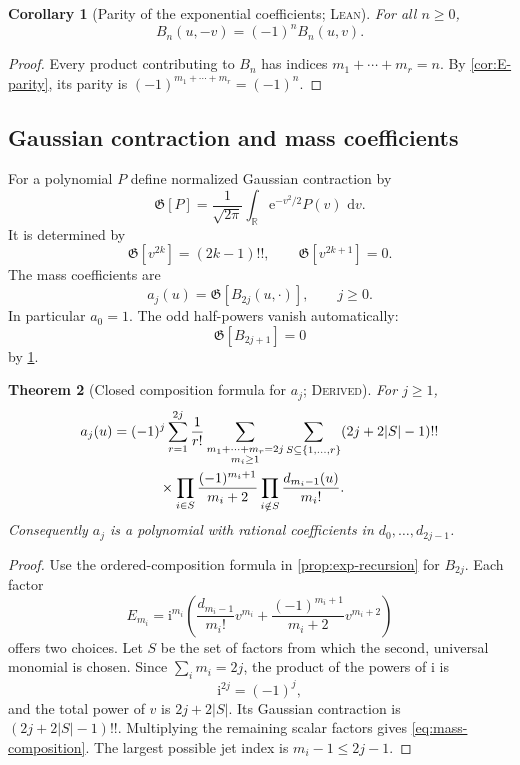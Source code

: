 \documentclass[11pt,oneside]{article}
\newtheorem{theorem}{Theorem}[section]
\newtheorem{corollary}[theorem]{Corollary}
\theoremstyle{definition}
\theoremstyle{remark}
\newcommand{\R}{\mathbb R}
\newcommand{\e}{\mathrm e}
\newcommand{\ii}{\mathrm i}
\newcommand{\dd}{\,\mathrm d}
\newcommand{\Gauss}{\mathfrak G}
\newcommand{\Formalized}{\textsc{Lean}}
\newcommand{\Derived}{\textsc{Derived}}
\begin{document}
\begin{corollary}[Parity of the exponential coefficients; \Formalized]
\label{cor:B-parity}
For all $n\geq0$,
\[
 B_n(u,-v)=(-1)^nB_n(u,v).
\]
\end{corollary}

\begin{proof}
Every product contributing to $B_n$ has indices
$m_1+\cdots+m_r=n$.  By \cref{cor:E-parity}, its parity is
$(-1)^{m_1+\cdots+m_r}=(-1)^n$.
\end{proof}

\subsection{Gaussian contraction and mass coefficients}

For a polynomial $P$ define normalized Gaussian contraction by
\[
 \Gauss[P]
 =\frac1{\sqrt{2\pi}}\int_{\R}\e^{-v^2/2}P(v)\,\dd v.
\]
It is determined by
\begin{equation}
 \Gauss[v^{2k}]=(2k-1)!!,\qquad
 \Gauss[v^{2k+1}]=0. \label{eq:gaussian-moments}
\end{equation}
The mass coefficients are
\begin{equation}
 a_j(u)=\Gauss[B_{2j}(u,\cdot)],\qquad j\geq0.
 \label{eq:mass-coeff-definition}
\end{equation}
In particular $a_0=1$.  The odd half-powers vanish automatically:
\[
 \Gauss[B_{2j+1}]=0
\]
by \cref{cor:B-parity}.

\begin{theorem}[Closed composition formula for \(a_j\); \Derived]
\label{thm:mass-composition}
For $j\geq1$,
\begin{align}
 a_j(u)
 ={}&(-1)^j
 \sum_{r=1}^{2j}\frac1{r!}
 \sum_{\substack{m_1+\cdots+m_r=2j\\m_i\geq1}}
 \sum_{S\subseteq\{1,\dots,r\}}
 (2j+2|S|-1)!! \notag\\
 &\qquad{}\times
 \prod_{i\in S}\frac{(-1)^{m_i+1}}{m_i+2}
 \prod_{i\notin S}\frac{d_{m_i-1}(u)}{m_i!}.
 \label{eq:mass-composition}
\end{align}
Consequently $a_j$ is a polynomial with rational coefficients in
$d_0,\dots,d_{2j-1}$.
\end{theorem}

\begin{proof}
Use the ordered-composition formula in
\cref{prop:exp-recursion} for $B_{2j}$.  Each factor
\[
 E_{m_i}
 =\ii^{m_i}\left(
   \frac{d_{m_i-1}}{m_i!}v^{m_i}
   +\frac{(-1)^{m_i+1}}{m_i+2}v^{m_i+2}
 \right)
\]
offers two choices.  Let $S$ be the set of factors from which the second,
universal monomial is chosen.  Since $\sum_i m_i=2j$, the product of the
powers of $\ii$ is
\[
 \ii^{2j}=(-1)^j,
\]
and the total power of $v$ is $2j+2|S|$.  Its Gaussian contraction is
$(2j+2|S|-1)!!$.  Multiplying the remaining scalar factors gives
\eqref{eq:mass-composition}.  The largest possible jet index is
$m_i-1\leq2j-1$.
\end{proof}
\end{document}
